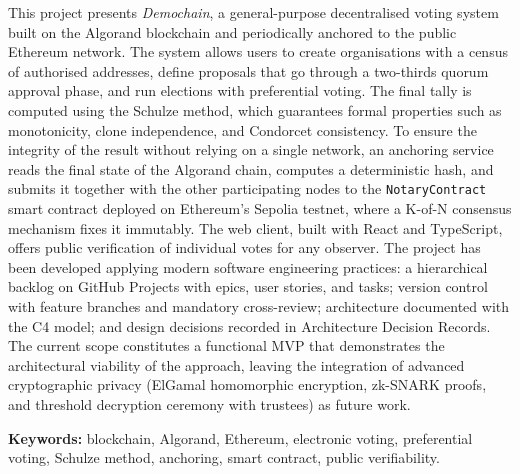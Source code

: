 This project presents \emph{Demochain}, a general-purpose decentralised
voting system built on the Algorand blockchain and periodically anchored
to the public Ethereum network. The system allows users to create
organisations with a census of authorised addresses, define proposals
that go through a two-thirds quorum approval phase, and run elections
with preferential voting. The final tally is computed using the Schulze
method, which guarantees formal properties such as monotonicity, clone
independence, and Condorcet consistency. To ensure the integrity of the
result without relying on a single network, an anchoring service reads
the final state of the Algorand chain, computes a deterministic hash,
and submits it together with the other participating nodes to the
\texttt{NotaryContract} smart contract deployed on Ethereum's Sepolia
testnet, where a K-of-N consensus mechanism fixes it immutably. The web
client, built with React and TypeScript, offers public verification of
individual votes for any observer. The project has been developed
applying modern software engineering practices: a hierarchical backlog
on GitHub Projects with epics, user stories, and tasks; version control
with feature branches and mandatory cross-review; architecture
documented with the C4 model; and design decisions recorded in
Architecture Decision Records. The current scope constitutes a
functional MVP that demonstrates the architectural viability of the
approach, leaving the integration of advanced cryptographic privacy
(ElGamal homomorphic encryption, zk-SNARK proofs, and threshold
decryption ceremony with trustees) as future work.

\textbf{Keywords:} blockchain, Algorand, Ethereum, electronic voting,
preferential voting, Schulze method, anchoring, smart contract, public
verifiability.
